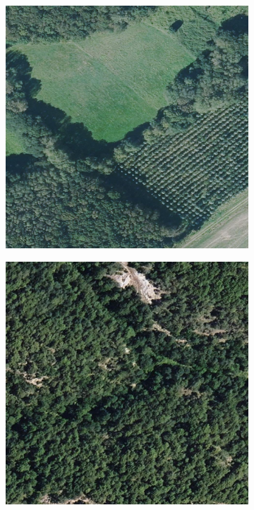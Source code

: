 \begin{figure}[H]
    \centering
    
    \begin{subfigure}[b]{0.31\textwidth}
        \includegraphics[width=\linewidth]{figuras/15_1903_1997.0.jpg}
        \label{fig:orto1}
    \end{subfigure}
    \hfill
    \begin{subfigure}[b]{0.31\textwidth}
        \includegraphics[width=\linewidth]{figuras/25_2209_2001.0.jpg}

\end{subfigure}
\end{figure}
